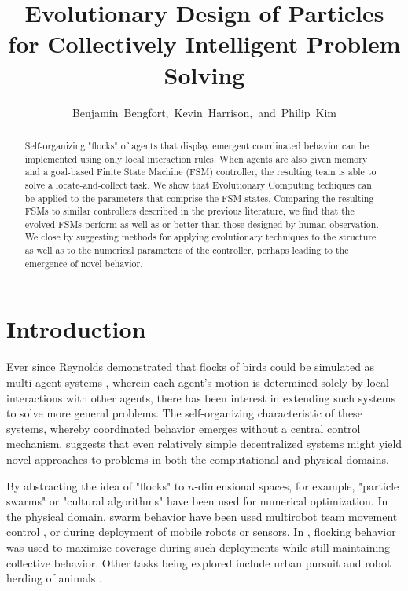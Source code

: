 \documentclass[12pt,journal,compsoc]{IEEEtran}
\begin{document}
\title{Evolutionary Design of Particles for Collectively Intelligent Problem Solving}
\author{Benjamin~Bengfort,~Kevin~Harrison,~and~Philip~Kim}

\maketitle

\begin{abstract}

Self-organizing "flocks" of agents that display emergent coordinated behavior can be implemented using only local interaction rules. When agents are also given memory and a goal-based Finite State Machine (FSM) controller, the resulting team is able to solve a locate-and-collect task. We show that Evolutionary Computing techiques can be applied to the parameters that comprise the FSM states. Comparing the resulting FSMs to similar controllers described in the previous literature, we find that the evolved FSMs perform as well as or better than those designed by human  observation. We close by suggesting methods for applying evolutionary techniques to the structure as well as to the numerical parameters of the controller, perhaps leading to the emergence of novel behavior.

\end{abstract}

\section{Introduction}

Ever since Reynolds demonstrated that flocks of birds could be simulated as multi-agent systems \cite{reynolds1987flocks}, wherein each agent's motion is determined solely by local interactions with other agents, there has been interest in extending such systems to solve more general problems. The self-organizing characteristic of these systems, whereby coordinated behavior emerges without a central control mechanism, suggests that even relatively simple decentralized systems might yield novel approaches to problems in both the computational and physical domains.

By abstracting the idea of "flocks" to $n$-dimensional spaces, for example, "particle swarms" \cite{kennedy1995particle,clerc2002particle} or "cultural algorithms" \cite{chung1996testbed} have been used for numerical optimization. In the physical domain, swarm behavior have been used multirobot team movement control \cite{balch1998behavior,ccelikkanat2010steering,hodgins1994robot}, or during deployment of mobile robots or sensors. In \cite{cheng2009distributed}, flocking behavior was used to maximize coverage during such deployments while still maintaining collective behavior. Other tasks being explored include urban pursuit \cite{winder2004using} and robot herding of animals \cite{vaughan1998robot}.
\end{document}
